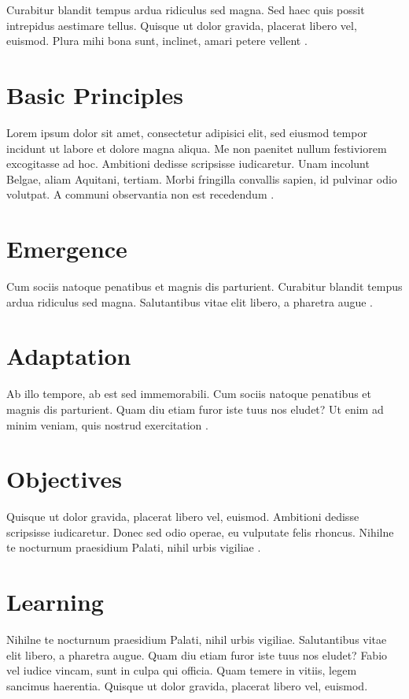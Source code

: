 Curabitur blandit tempus ardua ridiculus sed magna. Sed haec quis possit intrepidus aestimare tellus. Quisque ut dolor gravida, placerat libero vel, euismod. Plura mihi bona sunt, inclinet, amari petere vellent \autocite{grimm2006b}.

\section{Basic Principles}

Lorem ipsum dolor sit amet, consectetur adipisici elit, sed eiusmod tempor incidunt ut labore et dolore magna aliqua. Me non paenitet nullum festiviorem excogitasse ad hoc. Ambitioni dedisse scripsisse iudicaretur. Unam incolunt Belgae, aliam Aquitani, tertiam. Morbi fringilla convallis sapien, id pulvinar odio volutpat. A communi observantia non est recedendum \autocite{zurell2010}.

\section{Emergence}

Cum sociis natoque penatibus et magnis dis parturient. Curabitur blandit tempus ardua ridiculus sed magna. Salutantibus vitae elit libero, a pharetra augue \autocite{railsback2019a}.

\section{Adaptation}

Ab illo tempore, ab est sed immemorabili. Cum sociis natoque penatibus et magnis dis parturient. Quam diu etiam furor iste tuus nos eludet? Ut enim ad minim veniam, quis nostrud exercitation \autocite{grimm2020a}.

\section{Objectives}

Quisque ut dolor gravida, placerat libero vel, euismod. Ambitioni dedisse scripsisse iudicaretur. Donec sed odio operae, eu vulputate felis rhoncus. Nihilne te nocturnum praesidium Palati, nihil urbis vigiliae \autocite{szangolies2024}.

\section{Learning}

Nihilne te nocturnum praesidium Palati, nihil urbis vigiliae. Salutantibus vitae elit libero, a pharetra augue. Quam diu etiam furor iste tuus nos eludet? Fabio vel iudice vincam, sunt in culpa qui officia. Quam temere in vitiis, legem sancimus haerentia. Quisque ut dolor gravida, placerat libero vel, euismod\autocite{grimm2025}.

